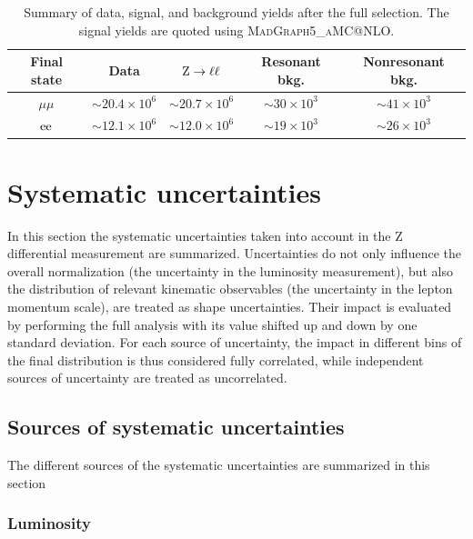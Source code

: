 \begin{table}[hbtp]
  \begin{center}
\caption{Summary of data, signal, and background yields after the full selection. 
The signal yields are quoted using \textsc{MadGraph5\_aMC@NLO}.\label{tab:zpt_yields}}
\begin{tabular}{ccccc}
\hline
Final state      & Data & $\mathrm{Z}\to\ell\ell$ & Resonant bkg. & Nonresonant bkg. \\
\hline
$\mu\mu$         & $\sim 20.4 \times 10^{6}$ & $\sim 20.7 \times 10^{6}$ & $\sim 30 \times 10^{3}$ & $\sim 41 \times 10^{3}$ \\
$\mathrm{e}\mathrm{e}$         & $\sim 12.1 \times 10^{6}$ & $\sim 12.0 \times 10^{6}$ & $\sim 19 \times 10^{3}$ & $\sim 26 \times 10^{3}$ \\
\hline
  \end{tabular}
  \end{center}
\end{table}

\section{Systematic uncertainties}

In this section the systematic uncertainties taken into
account in the Z differential measurement are summarized. 
Uncertainties do not only influence the overall normalization
(\eg the uncertainty in the luminosity measurement), but also the
distribution of relevant kinematic observables (\eg the uncertainty in
the lepton momentum scale), are treated as shape uncertainties. Their
impact is evaluated by performing the full analysis 
with its value shifted up and down by one standard deviation. For
each source of uncertainty, the impact in different bins of the final 
distribution is thus considered fully correlated, while
independent sources of uncertainty are treated as uncorrelated.

\subsection{Sources of systematic uncertainties}
The different sources of the systematic uncertainties are summarized in this section

\subsubsection{Luminosity}

